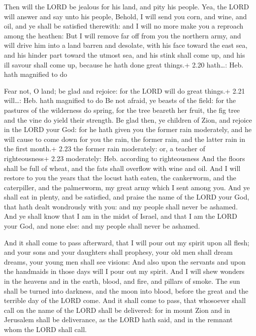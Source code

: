  Then will the LORD be jealous for his land, and pity his
people.  Yea, the LORD will answer and say unto his people,
Behold, I will send you corn, and wine, and oil, and ye shall be
satisfied therewith: and I will no more make you a reproach among the
heathen:  But I will remove far off from you the northern
army, and will drive him into a land barren and desolate, with his face
toward the east sea, and his hinder part toward the utmost sea, and his
stink shall come up, and his ill savour shall come up, because he hath
done great things.+ 2.20 hath\ldots: Heb. hath magnified to do

 Fear not, O land; be glad and rejoice: for the LORD will
do great things.+ 2.21 will\ldots: Heb. hath magnified to do
 Be not afraid, ye beasts of the field: for the pastures of
the wilderness do spring, for the tree beareth her fruit, the fig tree
and the vine do yield their strength.  Be glad then, ye
children of Zion, and rejoice in the LORD your God: for he hath given
you the former rain moderately, and he will cause to come down for you
the rain, the former rain, and the latter rain in the first month.+ 2.23
the former rain moderately: or, a teacher of righteousness+ 2.23
moderately: Heb. according to righteousness  And the floors
shall be full of wheat, and the fats shall overflow with wine and oil.
 And I will restore to you the years that the locust hath
eaten, the cankerworm, and the caterpiller, and the palmerworm, my great
army which I sent among you.  And ye shall eat in plenty,
and be satisfied, and praise the name of the LORD your God, that hath
dealt wondrously with you: and my people shall never be ashamed.
 And ye shall know that I am in the midst of Israel, and
that I am the LORD your God, and none else: and my people shall never be
ashamed.

 And it shall come to pass afterward, that I will pour
out my spirit upon all flesh; and your sons and your daughters shall
prophesy, your old men shall dream dreams, your young men shall see
visions:  And also upon the servants and upon the handmaids
in those days will I pour out my spirit.  And I will shew
wonders in the heavens and in the earth, blood, and fire, and pillars of
smoke.  The sun shall be turned into darkness, and the moon
into blood, before the great and the terrible day of the LORD come.
 And it shall come to pass, that whosoever shall call on
the name of the LORD shall be delivered: for in mount Zion and in
Jerusalem shall be deliverance, as the LORD hath said, and in the
remnant whom the LORD shall call.

